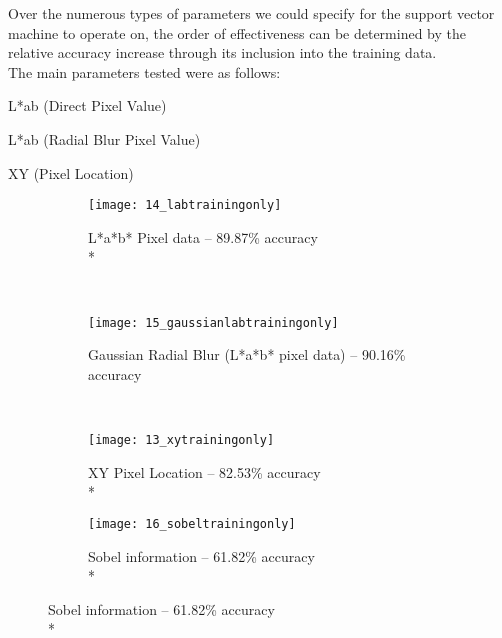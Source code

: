 Over the numerous types of parameters we could specify for the support vector machine to operate on, the order of effectiveness can be determined by the relative accuracy increase through its inclusion into the training data.
\\
The main parameters tested were as follows:
\begin{description}
  \item L*ab (Direct Pixel Value)
  \item L*ab (Radial Blur Pixel Value)
  \item XY (Pixel Location)
\end{description}
\begin{figure}
        \centering
        \begin{subfigure}[b]{0.3\textwidth}
                \centering
                \texttt{[image: 14\_labtrainingonly]}
                \caption{L*a*b* Pixel data -- 89.87\% accuracy \\*}
                \label{fig:14_labtrainingonly}
        \end{subfigure}%
        ~ %
        \begin{subfigure}[b]{0.3\textwidth}
                \centering
                \texttt{[image: 15\_gaussianlabtrainingonly]}
                \caption{Gaussian Radial Blur (L*a*b* pixel data) -- 90.16\% accuracy}
                \label{fig:15_gaussianlabtrainingonly}     
        \end{subfigure}
        ~ %
        \begin{subfigure}[b]{0.3\textwidth}
                \centering
                \texttt{[image: 13\_xytrainingonly]}
                \caption{XY Pixel Location -- 82.53\% accuracy \\*}
                \label{fig:13_xytrainingonly}
        \end{subfigure}
         \begin{subfigure}[b]{0.3\textwidth}
                \centering
                \texttt{[image: 16\_sobeltrainingonly]}
                \caption{Sobel information -- 61.82\% accuracy \\*}
                \label{fig:16_sobeltrainingonly}
        \end{subfigure}

\end{figure}
